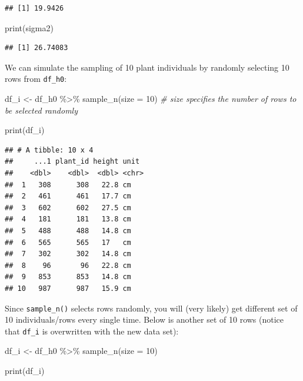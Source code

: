 \documentclass[
]{article}
\newenvironment{Shaded}{\begin{snugshade}}{\end{snugshade}}
\newcommand{\AttributeTok}[1]{\textcolor[rgb]{0.77,0.63,0.00}{#1}}
\newcommand{\CommentTok}[1]{\textcolor[rgb]{0.56,0.35,0.01}{\textit{#1}}}
\newcommand{\DecValTok}[1]{\textcolor[rgb]{0.00,0.00,0.81}{#1}}
\newcommand{\FunctionTok}[1]{\textcolor[rgb]{0.00,0.00,0.00}{#1}}
\newcommand{\NormalTok}[1]{#1}
\newcommand{\OtherTok}[1]{\textcolor[rgb]{0.56,0.35,0.01}{#1}}
\newcommand{\SpecialCharTok}[1]{\textcolor[rgb]{0.00,0.00,0.00}{#1}}
\begin{document}
\begin{verbatim}
## [1] 19.9426
\end{verbatim}

\begin{Shaded}
\begin{Highlighting}[]
\FunctionTok{print}\NormalTok{(sigma2)}
\end{Highlighting}
\end{Shaded}

\begin{verbatim}
## [1] 26.74083
\end{verbatim}

We can simulate the sampling of 10 plant individuals by randomly selecting 10 rows from \texttt{df\_h0}:

\begin{Shaded}
\begin{Highlighting}[]
\NormalTok{df\_i }\OtherTok{\textless{}{-}}\NormalTok{ df\_h0 }\SpecialCharTok{\%\textgreater{}\%} 
  \FunctionTok{sample\_n}\NormalTok{(}\AttributeTok{size =} \DecValTok{10}\NormalTok{) }\CommentTok{\# size specifies the number of rows to be selected randomly}

\FunctionTok{print}\NormalTok{(df\_i)}
\end{Highlighting}
\end{Shaded}

\begin{verbatim}
## # A tibble: 10 x 4
##     ...1 plant_id height unit 
##    <dbl>    <dbl>  <dbl> <chr>
##  1   308      308   22.8 cm   
##  2   461      461   17.7 cm   
##  3   602      602   27.5 cm   
##  4   181      181   13.8 cm   
##  5   488      488   14.8 cm   
##  6   565      565   17   cm   
##  7   302      302   14.8 cm   
##  8    96       96   22.8 cm   
##  9   853      853   14.8 cm   
## 10   987      987   15.9 cm
\end{verbatim}

Since \texttt{sample\_n()} selects rows randomly, you will (very likely) get different set of 10 individuals/rows every single time. Below is another set of 10 rows (notice that \texttt{df\_i} is overwritten with the new data set):

\begin{Shaded}
\begin{Highlighting}[]
\NormalTok{df\_i }\OtherTok{\textless{}{-}}\NormalTok{ df\_h0 }\SpecialCharTok{\%\textgreater{}\%} 
  \FunctionTok{sample\_n}\NormalTok{(}\AttributeTok{size =} \DecValTok{10}\NormalTok{)}

\FunctionTok{print}\NormalTok{(df\_i)}
\end{Highlighting}
\end{Shaded}
\end{document}
